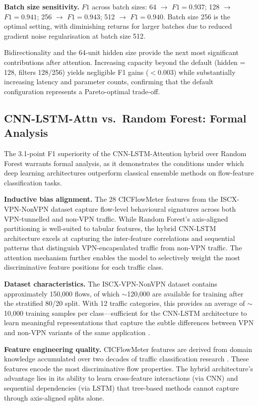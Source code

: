 \documentclass[conference]{IEEEtran}
\begin{document}
\textbf{Batch size sensitivity.} $F1$ across batch sizes: 64 $\to$ $F1 = 0.937$;
128 $\to$ $F1 = 0.941$; 256 $\to$ $F1 = 0.943$; 512 $\to$ $F1 = 0.940$.
Batch size 256 is the optimal setting, with diminishing returns for larger
batches due to reduced gradient noise regularisation at batch size 512.

Bidirectionality and the 64-unit hidden size provide the next most significant
contributions after attention. Increasing capacity beyond the default (hidden =
128, filters 128/256) yields negligible F1 gains ($< 0.003$) while substantially
increasing latency and parameter counts, confirming that the default configuration
represents a Pareto-optimal trade-off.

\subsection{CNN-LSTM-Attn vs.\ Random Forest: Formal Analysis}
\label{ssec:rfvsdl}

The 3.1-point F1 superiority of the CNN-LSTM-Attention hybrid over Random Forest
warrants formal analysis, as it demonstrates the conditions under which deep
learning architectures outperform classical ensemble methods on flow-feature
classification tasks.

\textbf{Inductive bias alignment.} The 28 CICFlowMeter features from the
ISCX-VPN-NonVPN dataset capture flow-level behavioural signatures across both
VPN-tunnelled and non-VPN traffic. While Random Forest's axis-aligned partitioning
is well-suited to tabular features, the hybrid CNN-LSTM architecture excels at
capturing the inter-feature correlations and sequential patterns that
distinguish VPN-encapsulated traffic from non-VPN traffic. The attention mechanism
further enables the model to selectively weight the most discriminative feature
positions for each traffic class.

\textbf{Dataset characteristics.} The ISCX-VPN-NonVPN dataset contains
approximately 150,000 flows, of which $\sim$120,000 are available for training
after the stratified 80/20 split. With 12 traffic categories, this provides
an average of $\sim$10,000 training samples per class---sufficient for the
CNN-LSTM architecture to learn meaningful representations that capture the
subtle differences between VPN and non-VPN variants of the same application
\cite{rezaei2019}.

\textbf{Feature engineering quality.} CICFlowMeter features are derived from
domain knowledge accumulated over two decades of traffic classification research
\cite{moore2005,draper2016}. These features encode the most
discriminative flow properties. The hybrid architecture's advantage lies in its
ability to learn cross-feature interactions (via CNN) and sequential dependencies
(via LSTM) that tree-based methods cannot capture through axis-aligned splits alone.
\end{document}
